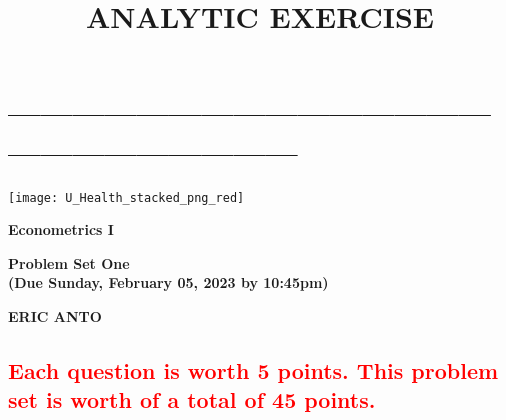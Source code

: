 \documentclass[
  12pt,
]{article}
\title{\textbf{ANALYTIC EXERCISE}}
\author{}
\date{\vspace{-2.5em}}
\begin{document}
\maketitle

\hypertarget{section}{%
\section{------------------------------------------------------------------------}\label{section}}

\allsectionsfont{\centering}
\subsectionfont{\raggedright}
\subsubsectionfont{\raggedright}


\begin{centering}

\vspace{0.7cm}




\begin{center}\texttt{[image: U\_Health\_stacked\_png\_red]} \end{center}

\vspace{0.6cm}

\Large

\doublespacing
{\bf Econometrics I}

\vspace{0.2 cm}

\singlespacing
{\bf Problem Set One }\\
{\bf (Due Sunday, February 05, 2023  by 10:45pm)}

\vspace{0.5 cm}

\normalsize

\vspace{0.3 cm}

\Large

{\bf ERIC ANTO}



\normalsize


\end{centering}
\newpage


\hypertarget{section-1}{%
\subsection{\texorpdfstring{\textcolor{red}{Each question is worth 5 points. This problem set is worth of a total of 45 points.}}{}}\label{section-1}}
\end{document}
